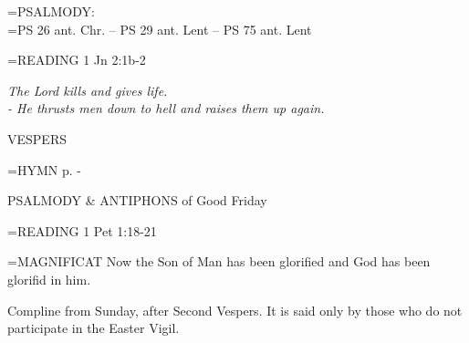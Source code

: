 \hangindent=\parindent \small{PSALMODY:}\\
\hangindent=\parindent  PS 26 ant. Chr. -- PS 29 ant. Lent -- PS 75 ant. Lent\vspace{0.5em}

\hangindent=\parindent \small{READING}    1 Jn 2:1b-2 \textbf{   }

\begin{center}
\textit{The Lord kills and gives life.\\
- He thrusts men down to hell and raises them up again.}
\end{center}

\begin{flushleft}\normalsize VESPERS\\\end{flushleft}

\hangindent=\parindent \small{\uppercase{HYMN} p.  \pageref{holyweek:firstHymn} - \pageref{holyweek:lastHymn}\\}

PSALMODY \& ANTIPHONS of Good Friday

\hangindent=\parindent \small{READING}    1 Pet 1:18-21 \textbf{   \\}

\hangindent=\parindent \small{MAGNIFICAT 	Now the Son of Man has been glorified and God has been glorifid in him.\\}

Compline from Sunday, after Second Vespers. It is said only by those who do not participate in the Easter Vigil.
